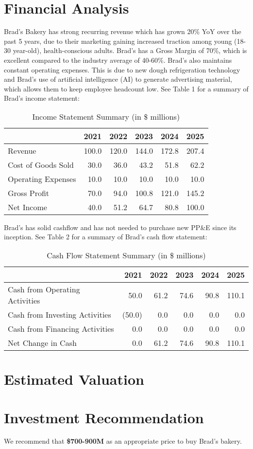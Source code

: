 \documentclass[11pt]{article}
\begin{document}
\section{Financial Analysis}
Brad's Bakery has strong recurring revenue which has grown 20\% YoY over the past 5 years, due to their marketing gaining increased traction among young (18-30 year-old), health-conscious adults. Brad's has a Gross Margin of 70\%, which is excellent compared to the industry average of 40-60\%. Brad's also maintains constant operating expenses. This is due to new dough refrigeration technology and Brad's use of artificial intelligence (AI) to generate advertising material, which allows them to keep employee headcount low. See Table 1 for a summary of Brad's income statement:
\begin{table}[H]
    \centering
    \caption{Income Statement Summary (in \$ millions)}
    \begin{tabular}{lrrrrr}
        \toprule
        & 2021 & 2022 & 2023 & 2024 & 2025 \\
        \midrule
        Revenue                  & 100.0 & 120.0 & 144.0 & 172.8 & 207.4 \\
        Cost of Goods Sold       & 30.0 & 36.0 & 43.2 & 51.8 & 62.2 \\
        Operating Expenses       & 10.0 & 10.0 & 10.0 & 10.0 & 10.0 \\
        \addlinespace 
        Gross Profit             & 70.0 & 94.0 & 100.8 & 121.0 & 145.2 \\ 
        Net Income               & 40.0 & 51.2 & 64.7 & 80.8 & 100.0 \\
        \bottomrule
    \end{tabular}
\end{table}
Brad's has solid cashflow and has not needed to purchase new PP\&E since its inception. See Table 2 for a summary of Brad's cash flow statement:
\begin{table}[H]
    \centering
    \caption{Cash Flow Statement Summary (in \$ millions)}
    \begin{tabular}{lrrrrr}
        \toprule
        & 2021 & 2022 & 2023 & 2024 & 2025 \\
        \midrule
        Cash from Operating Activities & 50.0 & 61.2 & 74.6 & 90.8 & 110.1 \\
        Cash from Investing Activities & (50.0) & 0.0 & 0.0 & 0.0 & 0.0 \\
        Cash from Financing Activities & 0.0 & 0.0 & 0.0 & 0.0 & 0.0 \\
        \addlinespace
        Net Change in Cash            & 0.0 & 61.2 & 74.6 & 90.8 & 110.1 \\
        \bottomrule
    \end{tabular}
\end{table}
\section{Estimated Valuation}
\section{Investment Recommendation}
We recommend that \textbf{\$700-900M} as an appropriate price to buy Brad's bakery.
\end{document}
